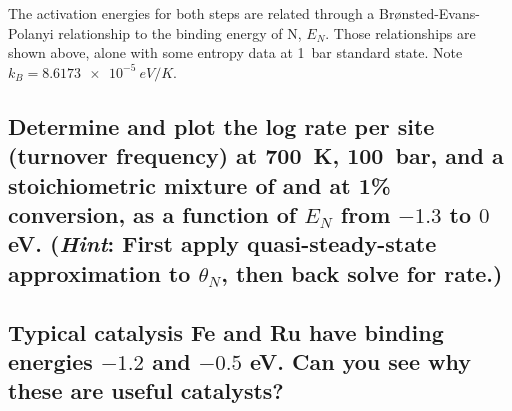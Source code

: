 \documentclass[11pt]{article}
\begin{document}
\noindent The activation energies for both steps are related through a Br\o{}nsted-Evans-Polanyi relationship to the binding energy of N, \(E_N\). Those relationships are shown above, alone with some entropy data at \SI{1}{bar} standard state. Note \(k_B = \SI{8.6173e-5}{eV/K}\).

\subsection{Determine and plot the log rate per site (turnover frequency) at \SI{700}{K}, \SI{100}{bar}, and a stoichiometric mixture of  and  at 1\% conversion, as a function of \(E_N\) from \(-1.3\) to \(0\) eV.  (\emph{Hint}: First apply quasi-steady-state approximation to \(\theta_N\), then back solve for rate.)}
\label{sec:org253125e}

\subsection{Typical catalysis Fe and Ru have binding energies \(-1.2\)  and \(-0.5\) eV.  Can you see why these are useful catalysts?}
\label{sec:org6a630e4}
\end{document}
